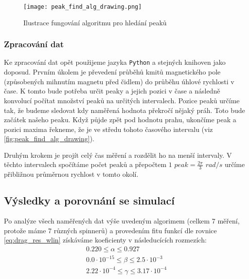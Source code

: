\documentclass[12pt, a4paper,
 twoside,        %
 openright
]{report}
\begin{document}
\begin{wrapfigure}{r}{0.5\textwidth}
    \vspace*{3cm}
    \texttt{[image: peak\_find\_alg\_drawing.png]}
    \centering
    \caption{Ilustrace fungování algoritmu pro hledání peaků}
    \label{fig:peak_find_alg_drawing}
\end{wrapfigure}
\subsubsection{Zpracování dat}
Ke zpracování dat opět použijeme jazyka \texttt{Python} a stejných knihoven jako doposud.
Prvním úkolem je převedení průběhů kmitů magnetického pole (způsobených mihnutím magnetu před čidlem) do průběhu úhlové rychlosti v čase.
K tomto bude potřeba určit peaky a jejich pozici v čase a následně konvolucí počítat množství peaků na určitých intervalech.
Pozice peaků určíme tak, že budeme sledovat kdy naměřená hodnota překročí nějaký práh. Toto bude začátek našeho peaku.
Když půjde zpět pod hodnotu prahu, ukončíme peak a pozici maxima řekneme, že je ve středu tohoto časového intervalu (viz \autoref{fig:peak_find_alg_drawing}).

\clearpage

Druhým krokem je projít celý čas měření a rozdělit ho na menší intervaly. V těchto intervalech spočítáme počet peaků a přepočtem $1$ $peak = \frac{2\pi}{3}$ $rad/s$ určíme přibližnou průměrnou rychlost v tomto okolí.

\clearpage


\subsection{Výsledky a porovnání se simulací}
Po analýze všech naměřených dat výše uvedeným algorimem (celkem 7 měření, protože máme 7 různých spinnerů) a provedením fitu funkcí dle rovnice \ref{eq:drag_res_wlin} získáváme koeficienty v následucících rozmezích:
\begin{equation}
    \label{eq:drag_coef_res}
    \begin{gathered}
        0.220 \leq \alpha \leq 0.927 \\
        0.0 \cdot 10^{-15} \leq \beta \leq 2.5 \cdot 10^{-3} \\
        2.22 \cdot 10^{-4} \leq \gamma \leq 3.17 \cdot 10^{-4} \\
    \end{gathered}
\end{equation}
\end{document}
